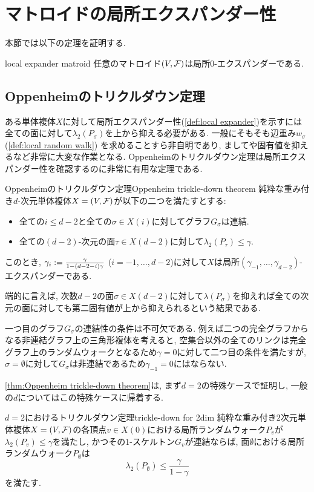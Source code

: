 \section{マトロイドの局所エクスパンダー性}
本節では以下の定理を証明する.
\begin{lemma}{}{local expander matroid}
    任意のマトロイド$(V,\mathcal{F})$は局所$0$-エクスパンダーである.
\end{lemma}


\subsection{Oppenheimのトリクルダウン定理}
ある単体複体$X$に対して局所エクスパンダー性(\cref{def:local expander})を示すには全ての面に対して$\lambda_2(P_\sigma)$を上から抑える必要がある.
一般にそもそも辺重み$w_\sigma$ (\cref{def:local random walk}) を求めることすら非自明であり, ましてや固有値を抑えるなど非常に大変な作業となる.
Oppenheimのトリクルダウン定理\cite{Oppenheim_tricling_down}は局所エクスパンダー性を確認するのに非常に有用な定理である.
\begin{theorem}{Oppenheimのトリクルダウン定理}{Oppenheim trickle-down theorem}
    純粋な重み付き$d$-次元単体複体$X = (V,\mathcal{F})$が以下の二つを満たすとする:
    \begin{itemize}
    \item 全ての$i\le d-2$と全ての$\sigma\in X(i)$に対してグラフ$G_\sigma$は連結.
    \item 全ての$(d-2)$-次元の面$\tau \in X(d-2)$に対して$\lambda_2(P_\tau) \le \gamma$.
    \end{itemize}
    このとき, $\gamma_i \mathrel{:=} \frac{\gamma}{1-(d-2-i)\gamma}$ ($i=-1,\dots,d-2$)に対して$X$は局所$(\gamma_{-1},\dots,\gamma_{d-2})$-エクスパンダーである.
\end{theorem}
端的に言えば, 次数$d-2$の面$\sigma \in X(d-2)$に対して$\lambda(P_\sigma)$を抑えれば全ての次元の面に対しても第二固有値が上から抑えられるという結果である.

一つ目のグラフ$G_\sigma$の連結性の条件は不可欠である.
例えば二つの完全グラフからなる非連結グラフ上の三角形複体を考えると,
空集合以外の全てのリンクは完全グラフ上のランダムウォークとなるため$\gamma=0$に対して二つ目の条件を満たすが, $\sigma=\emptyset$に対して$G_\sigma$は非連結であるため$\gamma_{-1}=0$にはならない.


\cref{thm:Oppenheim trickle-down theorem}は, まず$d=2$の特殊ケースで証明し, 一般の$d$についてはこの特殊ケースに帰着する.
%
\begin{lemma}{\texorpdfstring{$d=2$}{2次元}におけるトリクルダウン定理}{trickle-down for 2dim}
    純粋な重み付き$2$次元単体複体$X=(V,\mathcal{F})$の各頂点$v\in X(0)$における局所ランダムウォーク$P_v$が$\lambda_2(P_v) \le \gamma$を満たし, かつその$1$-スケルトン$G_v$が連結ならば, 面$\emptyset$における局所ランダムウォーク$P_\emptyset$は
    \[
        \lambda_2(P_\emptyset) \le \frac{\gamma}{1-\gamma}
    \]
    を満たす.
\end{lemma}

